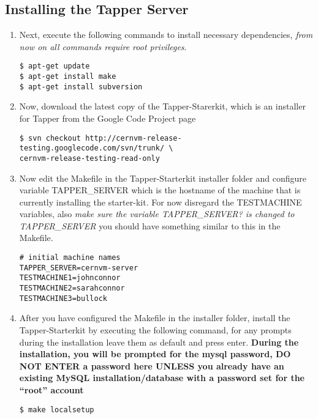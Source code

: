 \subsection{Installing the Tapper Server}
\begin{enumerate}
\item Next, execute the following commands to install necessary dependencies, \emph{from now on all commands require root privileges}.
\lstset{caption= Install Dependencies}
\begin{lstlisting}
$ apt-get update
$ apt-get install make
$ apt-get install subversion
\end{lstlisting}

\item Now, download the latest copy of the Tapper-Starerkit, which is an installer for Tapper from the \cernvmreleasetesting 
Google Code Project page
\lstset{caption= Download Tapper-Starterkit}
\begin{lstlisting}
$ svn checkout http://cernvm-release-testing.googlecode.com/svn/trunk/ \
cernvm-release-testing-read-only
\end{lstlisting}

\item Now edit the Makefile in the Tapper-Starterkit installer folder and configure variable TAPPER\_SERVER which 
is the hostname of the machine that is currently installing the starter-kit. For now disregard the TESTMACHINE 
variables, also \emph{make sure the variable TAPPER\_SERVER? is changed to TAPPER\_SERVER} you should have something
similar to this in the Makefile.
\lstset{caption= Makefile Configuration}
\begin{lstlisting}
# initial machine names
TAPPER_SERVER=cernvm-server
TESTMACHINE1=johnconnor
TESTMACHINE2=sarahconnor
TESTMACHINE3=bullock
\end{lstlisting}

\item After you have configured the Makefile in the installer folder, install the Tapper-Starterkit by executing the
following command, for any prompts during the installation leave them as default and press enter. {\bf During
the installation, you will be prompted for the mysql password, DO NOT ENTER a password here UNLESS you already have an
existing MySQL installation/database with a password set for the ``root'' account}
\lstset{caption= Install Tapper-Starterkit}
\begin{lstlisting}
$ make localsetup
\end{lstlisting}
\end{enumerate}

